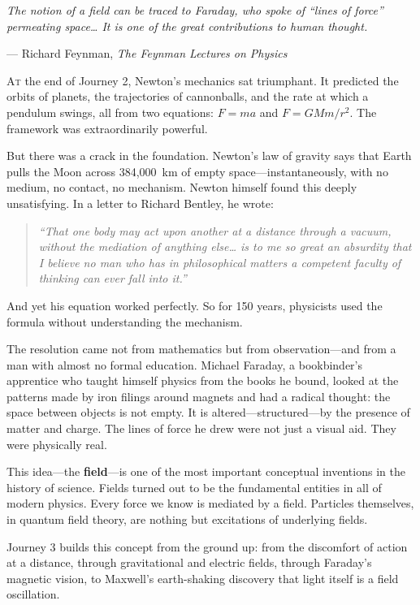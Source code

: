 \documentclass[12pt, a4paper, twoside]{book}
\theoremstyle{disc}
\begin{document}
\epigraph{\itshape
  The notion of a field can be traced to Faraday, who spoke of ``lines of force''
  permeating space\ldots{} It is one of the great contributions to human thought.
}{--- Richard Feynman, \textit{The Feynman Lectures on Physics}}

\lettrine[lines=3,loversize=0.1]{\textcolor{accent}{A}}{t} the end of Journey 2, Newton's mechanics sat triumphant. It predicted the orbits of planets, the trajectories of cannonballs, and the rate at which a pendulum swings, all from two equations: $F = ma$ and $F = GMm/r^2$. The framework was extraordinarily powerful.

But there was a crack in the foundation. Newton's law of gravity says that Earth pulls the Moon across 384,000~km of empty space---instantaneously, with no medium, no contact, no mechanism. Newton himself found this deeply unsatisfying. In a letter to Richard Bentley, he wrote:

\begin{quote}
\itshape
``That one body may act upon another at a distance through a vacuum, without the mediation of anything else\ldots{} is to me so great an absurdity that I believe no man who has in philosophical matters a competent faculty of thinking can ever fall into it.''
\end{quote}

And yet his equation worked perfectly. So for 150 years, physicists used the formula without understanding the mechanism.

The resolution came not from mathematics but from observation---and from a man with almost no formal education. Michael Faraday, a bookbinder's apprentice who taught himself physics from the books he bound, looked at the patterns made by iron filings around magnets and had a radical thought: the space between objects is not empty. It is altered---structured---by the presence of matter and charge. The lines of force he drew were not just a visual aid. They were physically real.

This idea---the \textbf{field}---is one of the most important conceptual inventions in the history of science. Fields turned out to be the fundamental entities in all of modern physics. Every force we know is mediated by a field. Particles themselves, in quantum field theory, are nothing but excitations of underlying fields.

Journey 3 builds this concept from the ground up: from the discomfort of action at a distance, through gravitational and electric fields, through Faraday's magnetic vision, to Maxwell's earth-shaking discovery that light itself is a field oscillation.
\end{document}
